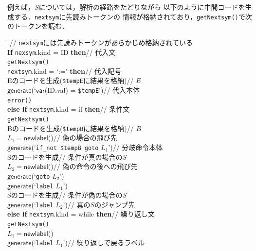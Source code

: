 \documentclass[dvipdfmx,a4j]{jbook}
\begin{document}
\begin{Exmp}
例えば，$S$については，解析の経路をたどりながら
以下のように中間コードを生成する．\verb|nextsym|に先読みトークンの
情報が格納されており，\verb|getNextsym()|で次のトークンを読む．
\begin{center}
\begin{mdframed}[userdefinedwidth=.8\linewidth]
\begin{tabbing}
\qquad\=\qquad\=\qquad\qquad\qquad\qquad\qquad\qquad\qquad\qquad\qquad\= \kill
// \verb|nextsym|には先読みトークンがあらかじめ格納されている\\
{\rm\bf If} \verb|nexsym|.kind = {\sf ID} {\rm\bf then}\>\>\>// 代入文\\
\> \verb|getNextsym()|\\
 \verb|nextsym|.kind = `{\sf :=}' {\rm\bf then}\>\>// 代入記号\\
\>\> Eのコードを生成(\verb|$tempE|に結果を格納)\>// $E$\\
\>\> $\mathsf{generate}$(`$\mathsf{var}$({\sf ID}.val) = \verb|$tempE|')\>// 代入本体\\
 \verb|error()|\\
{\rm\bf else if} \verb|nextsym|.kind = {\sf if} {\rm\bf then}\>\>\>// 条件文\\
\> \verb|getNextsym()|\\
\> Bのコードを生成(\verb|$tempB|に結果を格納)\>\>// $B$\\
\> $L_1=\mathsf{newlabel}$()\>\>// 偽の場合の飛び先\\
\> $\mathsf{generate}$(`\verb|if_not|\ \verb|$tempB|\ \verb|goto| $L_1$')\>\>// 分岐命令本体\\
\> Sのコードを生成\>\>// 条件が真の場合の$S$\\
\> $L_2=\mathsf{newlabel}$()\>\>// 偽の命令の後への飛び先\\
\> $\mathsf{generate}$(`\verb|goto| $L_2$')\\
\> $\mathsf{generate}$(`\verb|label| $L_1$')\\
\> Sのコードを生成\>\>// 条件が偽の場合の$S$\\
\> $\mathsf{generate}$(`\verb|label| $L_2$')\>\>// 真の$S$のジャンプ先\\
{\rm\bf else if} \verb|nextsym|.kind = {\sf while} {\rm\bf then}\>\>\>// 繰り返し文\\
\> \verb|getNextsym()|\\
\> $L_1=\mathsf{newlabel}$()\\
\> $\mathsf{generate}$(`\verb|label| $L_1$')\>\>// 繰り返しで戻るラベル\\

\end{tabbing}
\end{mdframed}
\end{center}
\end{Exmp}
\end{document}

